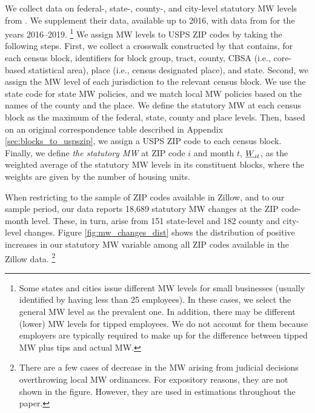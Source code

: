 We collect data on federal-, state-, county-, and city-level statutory MW levels 
from \textcite{VaghulZipperer2016}.
We supplement their data, available up to 2016, with data from 
\textcite{BerkeleyLaborCenter} for the years 2016--2019.%
\footnote{Some states and cities issue different MW levels for small businesses
(usually identified by having less than 25 employees).
In these cases, we select the general MW level as the prevalent one.
In addition, there may be different (lower) MW levels for tipped employees.
We do not account for them because employers are typically required to make up 
for the difference between tipped MW plus tips and actual MW.}
We assign MW levels to USPS ZIP codes by taking the following steps.
First, we collect a crosswalk constructed by \parencite{CensusLODES} that contains,
for each census block, identifiers for block group, tract, county, CBSA 
(i.e., core-based statistical area), place (i.e., census designated place), and state.
Second, we assign the MW level of each jurisdiction to the relevant census block.
We use the state code for state MW policies, and we match local MW policies 
based on the names of the county and the place.
We define the statutory MW at each census block as the maximum of the federal,
state, county and place levels.
Then, based on an original correspondence table described in Appendix 
\ref{sec:blocks_to_uspszip}, we assign a USPS ZIP code to each census
block.
Finally, we define \textit{the statutory MW} at ZIP code $i$ and month $t$, $\underline{W}_{it}$, 
as the weighted average of the statutory MW levels in its constituent blocks, 
where the weights are given by the number of housing units.

When restricting 
to the sample of ZIP codes available in Zillow, and 
to our sample period, our data reports 
18,689 statutory MW changes at the ZIP code-month level.
These, in turn, arise from 
151 state-level and 
182 county and city-level changes.
%
%
Figure \ref{fig:mw_changes_dist} shows the distribution of positive increases in
our statutory MW variable among all ZIP codes available in the Zillow data.%
\footnote{There are a few cases of decrease in the MW arising from judicial 
decisions overthrowing local MW ordinances.
For expository reasons, they are not shown in the figure.
However, they are used in estimations throughout the paper.}

